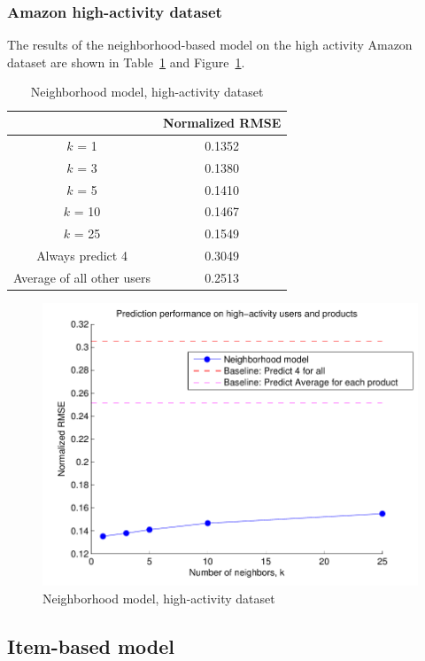 \documentclass[letterpaper, 11 pt, conference]{ieeeconf}
\begin{document}
\subsubsection{Amazon high-activity dataset}
The results of the neighborhood-based model on the high activity Amazon dataset 
are shown in Table~\ref{table:modelone_subset} and 
Figure~\ref{fig:modelone_subset}.

\begin{table}[htb]
\centering
\begin{tabular}{|c|c|}
\cline{2-2}

\multicolumn{1}{c|}{}  & {Normalized RMSE} \tabularnewline \hline
$k$ = 1 & 0.1352  \tabularnewline
$k$ = 3 & 0.1380 \tabularnewline
$k$ = 5 &  0.1410 \tabularnewline
$k$ = 10 &  0.1467 \tabularnewline
$k$ = 25  &  0.1549 \tabularnewline
\hline
Always predict 4 & 0.3049 \tabularnewline 
Average of all other users & 0.2513 \tabularnewline
\hline
\end{tabular}
\caption{Neighborhood model, high-activity dataset}
\label{table:modelone_subset}
\end{table}

\begin{figure}[h]
\includegraphics[scale=0.6]{images/modelone_subset.pdf}
\caption{Neighborhood model, high-activity dataset}
\label{fig:modelone_subset}
\end{figure}

\subsection{Item-based model}
\end{document}

